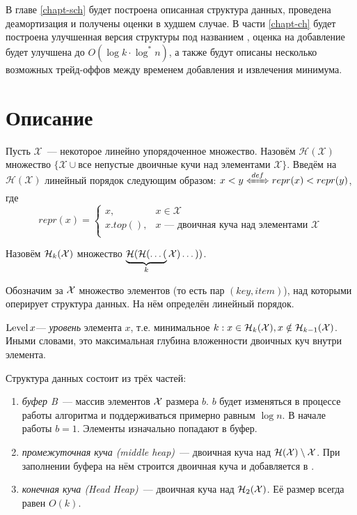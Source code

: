В главе \ref{chapt-sch} будет построена описанная структура данных,
проведена деамортизация и получены оценки в худшем случае.
В части \ref{chapt-ch} будет построена улучшенная версия
структуры под названием \CH,
оценка на добавление будет улучшена до $O(\log k \cdot \log^*n)$,
а также будут описаны несколько возможных трейд-оффов между временем
добавления и извлечения минимума.

\section{Описание}

\begin{definition}
Пусть $\mathcal{X}$~--- некоторое линейно упорядоченное множество.
Назовём $\mathcal{H}(\mathcal{X})$
множество $\{\mathcal{X} \cup \text{все непустые двоичные кучи над элементами }\mathcal{X}\}$.
Введём на $\mathcal{H}(\mathcal{X})$ линейный порядок следующим образом:
$x < y \xLeftrightarrow{def} repr(x) < repr(y)$, где
\[
repr(x) = \left\lbrace
    \begin{array}{ll}
    x,& x \in \mathcal{X} \\
    x.top(),& x\text{~--- двоичная куча над элементами }\mathcal{X} \\
    \end{array}
\right.
\]
\end{definition}
\begin{designation}
Назовём $\mathcal{H}_k(\mathcal{X})$ множество $\underbrace{\mathcal{H}(\mathcal{H}(\dots(}_k\mathcal{X})\dots))$.
\end{designation}

Обозначим за $\mathcal{X}$ множество элементов (то есть пар $(key, item)$),
над которыми оперирует структура данных. На нём определён линейный порядок.

\begin{definition}
$\operatorname{Level} x $--- \emph{уровень} элемента $x$, т.е. минимальное $k: x \in \mathcal{H}_k(\mathcal{X}),
x \notin \mathcal{H}_{k-1}(\mathcal{X})$. Иными словами, это максимальная глубина вложенности
двоичных куч внутри элемента.
\end{definition}

Структура данных состоит из трёх частей:
\begin{enumerate}
\item \emph{буфер B}~--- массив элементов $\mathcal{X}$ размера $b$. $b$ будет
изменяться в процессе работы алгоритма и поддерживаться примерно равным $\log n$.
В начале работы $b=1$.
Элементы изначально попадают в буфер.
\item \emph{промежуточная куча \MH (middle heap)}~--- двоичная куча над $\mathcal{H}(\mathcal{X})\setminus\mathcal{X}$.
При заполнении буфера на нём строится двоичная куча и добавляется в \MH.
\item \emph{конечная куча \HH  (Head Heap)}~--- двоичная куча над $\mathcal{H}_2(\mathcal{X})$.
Её размер всегда равен $O(k)$.
\end{enumerate}

